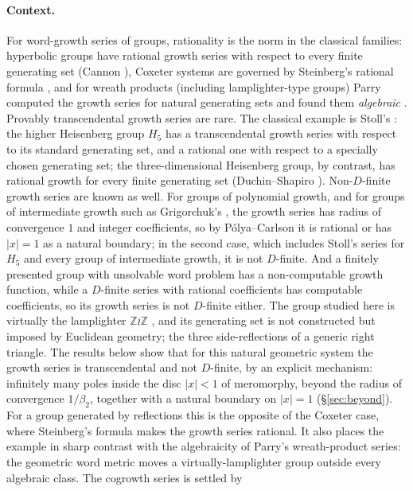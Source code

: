 \documentclass[11pt]{article}
\theoremstyle{plain}
\theoremstyle{definition}
\theoremstyle{remark}
\newcommand{\Z}{\mathbb{Z}}
\begin{document}
\paragraph{Context.} For word-growth series of groups, rationality is the norm in the classical
families: hyperbolic groups have rational growth series with respect to every finite generating set
(Cannon \cite{Cannon1984}), Coxeter systems are governed by Steinberg's rational formula \cite[\S5.12]{Humphreys1990}, and for
wreath products (including lamplighter-type groups) Parry computed the growth series for
natural generating sets and found them \emph{algebraic} \cite{Parry1992}. Provably transcendental
growth series are rare. The classical example is Stoll's \cite{Stoll1996}: the higher Heisenberg
group $H_5$ has a transcendental growth series with respect to its standard generating set, and a
rational one with respect to a specially chosen generating set; the three-dimensional Heisenberg
group, by contrast, has rational growth for every finite generating set (Duchin--Shapiro
\cite{DuchinShapiro2019}). Non-$D$-finite growth series are known as well. For groups of polynomial
growth, and for groups of intermediate growth such as Grigorchuk's \cite{Grigorchuk1984}, the growth
series has radius of convergence $1$ and integer coefficients, so by P\'olya--Carlson
\cite{Carlson1921} it is rational or has $|x|=1$ as a natural boundary; in the second case, which
includes Stoll's series for $H_5$ and every group of intermediate growth, it is not $D$-finite. And a
finitely presented group with unsolvable word problem has a non-computable growth function, while
a $D$-finite series with rational coefficients has computable coefficients, so its growth series is
not $D$-finite either. The group studied here is virtually the lamplighter
$\Z\wr\Z$ \cite{Bonfioli2026a}, and its generating set is not constructed but imposed by Euclidean
geometry; the three side-reflections of a generic right triangle. The results below show that for
this natural geometric system the growth series is transcendental and not $D$-finite, by an explicit
mechanism: infinitely many poles inside the disc $|x|<1$ of meromorphy, beyond the radius of
convergence $1/\beta_2$, together with a natural boundary on $|x|=1$ (\S\ref{sec:beyond}). For a
group generated by reflections this is the opposite of the Coxeter case, where Steinberg's formula
makes the growth series rational. It also places the example in sharp contrast with the
algebraicity of Parry's wreath-product series: the geometric word metric moves a
virtually-lamplighter group outside every algebraic class. The cogrowth series is settled by
\end{document}
